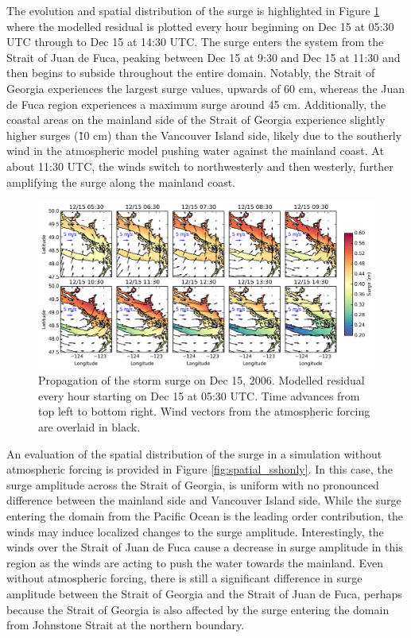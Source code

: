 \documentclass[pdftex,10pt]{article}
\begin{document}
The evolution and spatial distribution of the surge is highlighted in Figure \ref{fig:spatial} where the modelled residual is plotted every hour beginning on Dec 15 at 05:30 UTC through to Dec 15 at 14:30 UTC. The surge enters the system from the Strait of Juan de Fuca, peaking between Dec 15 at 9:30 and Dec 15 at 11:30 and then begins to subside throughout the entire domain. Notably, the Strait of Georgia experiences the largest surge values, upwards of 60 cm, whereas the Juan de Fuca region experiences a maximum surge around 45 cm. Additionally, the coastal areas on the mainland side of the Strait of Georgia experience slightly higher surges (\~ 10 cm) than the Vancouver Island side, likely due to the southerly wind in the atmospheric model pushing water against the mainland coast. At about 11:30 UTC, the winds switch to northwesterly and then westerly, further amplifying the surge along the mainland coast. 

\begin{figure}
\centering
\includegraphics[scale=0.6]{Figures/dec2006_spatial.pdf}
\caption{Propagation of the storm surge on Dec 15, 2006. Modelled residual every hour starting on Dec 15 at 05:30 UTC. Time advances from top left to bottom right. Wind vectors from the atmospheric forcing are overlaid in black.}
\label{fig:spatial}
\end{figure}

An evaluation of the spatial distribution of the surge in a simulation without atmospheric forcing is provided in Figure \ref{fig:spatial_sshonly}. In this case, the surge amplitude across the Strait of Georgia, is uniform with no pronounced difference between the mainland side and Vancouver Island side. While the surge entering the domain from the Pacific Ocean is the leading order contribution, the winds may induce localized changes to the surge amplitude. Interestingly, the winds over the Strait of Juan de Fuca cause a decrease in surge amplitude in this region as the winds are acting to push the water towards the mainland.  Even without atmospheric forcing, there is still a significant difference in surge amplitude between the Strait of Georgia and the Strait of Juan de Fuca, perhaps because the Strait of Georgia is also affected by the surge entering the domain from Johnstone Strait at the northern boundary.
\end{document}
